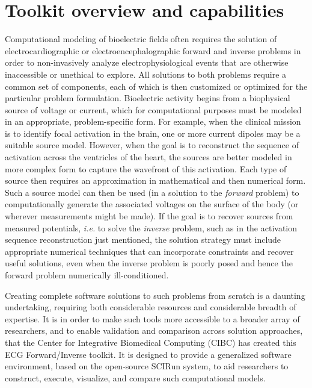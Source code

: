\section{Toolkit overview and capabilities}

Computational modeling of bioelectric fields often requires the solution of
electrocardiographic or electroencephalographic forward and inverse
problems in order to non-invasively analyze electrophysiological events
that are otherwise inaccessible or unethical to explore. All solutions to
both problems require a common set of components, each of which is then
customized or optimized for the particular problem formulation.
Bioelectric activity begins from a biophysical source of voltage or current,
which for computational purposes must be modeled in an appropriate,
problem-specific form. For example, when the clinical mission is to
identify focal activation in the brain, one or more current dipoles may be
a suitable source model. However, when the goal is to reconstruct the
sequence of activation across the ventricles of the heart, the sources are
better modeled in more complex form to capture the wavefront of this
activation. Each type of source then requires an approximation in
mathematical and then numerical form. Such a source model can then be used
(in a solution to the \textit{forward} problem) to computationally generate
the associated voltages on the surface of the body (or wherever
measurements might be made). If the goal is to recover sources from
measured potentials, \textit{i.e.} to solve the \textit{inverse} problem,
such as in the activation sequence reconstruction just mentioned, the
solution strategy must include appropriate numerical techniques that can
incorporate constraints and recover useful solutions, even when the inverse
problem is poorly posed and hence the forward problem numerically ill-conditioned.

Creating complete software solutions to such problems from scratch is a
daunting undertaking, requiring both considerable resources and considerable
breadth of expertise. It is in order to make such tools more accessible to
a broader array of researchers, and to enable validation and comparison
across solution approaches, that the Center for Integrative Biomedical
Computing (CIBC) has created this ECG Forward/Inverse toolkit. It is
designed to provide a generalized software environment, based on the open-source
SCIRun system, to aid researchers to construct, execute, visualize,
and compare such computational models.

